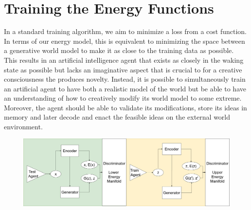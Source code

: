 \documentclass{article}
\begin{document}


\section{Training the Energy Functions}



In a standard training algorithm, we aim to minimize a loss from a cost function. In terms of our energy model, this is equivalent to minimizing the space between a generative world model to make it as close to the training data as possible. This results in an artificial intelligence agent that exists as closely in the waking state as possible but lacks an imaginative aspect that is crucial to for a creative consciousness the produces novelty. Instead, it is possible to simultaneously train an artificial agent to have both a realistic model of the world but be able to have an understanding of how to creatively modify its world model to some extreme. Moreover, the agent should be able to validate its modifications, store its ideas in memory and later decode and enact the feasible ideas on the external world environment. 
\begin{figure}[H]
    \centering
    \includegraphics[width=13.9cm]{dream-model-v2.png}
\end{figure}
\end{document}
